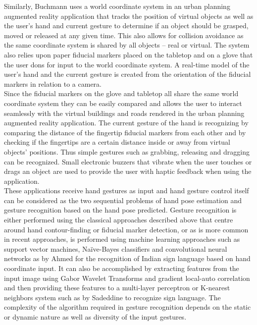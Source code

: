 Similarly, Buchmann \cite{fingartips} uses a world coordinate system in an urban planning augmented reality application that tracks the position of virtual objects as well as the user’s hand and current gesture to determine if an object should be grasped, moved or released at any given time. This also allows for collision avoidance as the same coordinate system is shared by all objects – real or virtual. The system also relies upon paper fiducial markers placed on the tabletop and on a glove that the user dons for input to the world coordinate system. A real-time model of the user's hand and the current gesture is created from the orientation of the fiducial markers in relation to a camera. \\

Since the fiducial markers on the glove and tabletop all share the same world coordinate system they can be easily compared and allows the user to interact seamlessly with the virtual buildings and roads rendered in the urban planning augmented reality application. The current gesture of the hand is recognizing by comparing the distance of the fingertip fiducial markers from each other and by checking if the fingertips are a certain distance inside or away from virtual objects' positions. Thus simple gestures such as grabbing, releasing and dragging can be recognized. Small electronic buzzers that vibrate when the user touches or drags an object are used to provide the user with haptic feedback when using the application. \\

These applications receive hand gestures as input and hand gesture control itself can be considered as the two sequential problems of hand pose estimation and gesture recognition based on the hand pose predicted. Gesture recognition is either performed using the classical approaches described above that centre around hand contour-finding or fiducial marker detection, or as is more common in recent approaches, is performed using machine learning approaches such as support vector machines, Naïve-Bayes classifiers and convolutional neural networks as by Ahmed \cite{indian_sign_language} for the recognition of Indian sign language based on hand coordinate input. It can also be accomplished by extracting features from the input image using Gabor Wavelet Transforms and gradient local-auto correlation and then providing these features to a multi-layer perceptron or K-nearest neighbors system such as by Sadeddine \cite{combined_sign_language} to recognize sign language. The complexity of the algorithm required in gesture recognition depends on the static or dynamic nature as well as diversity of the input gestures. \\

